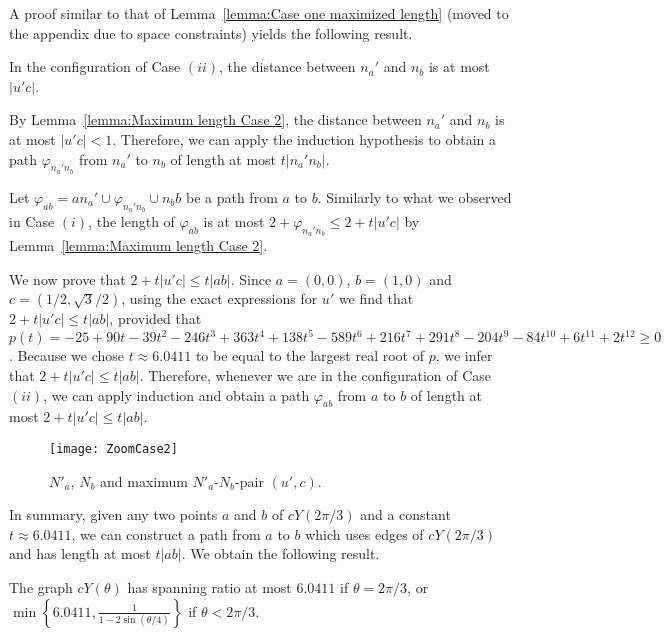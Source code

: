 \documentclass{cccg14}
\newcommand{\cyao}{\ensuremath{cY(\theta)}\xspace}
\newcommand{\cyaoOneTwenty}{\ensuremath{cY(2\pi/3)}\xspace}
\newcommand{\spanningRationCyao}{\ensuremath{6.0411}\xspace}
\begin{document}
A proof similar to that of Lemma~\ref{lemma:Case one maximized length} (moved to the appendix due to space constraints) yields the following result. \begin{lemma}\label{lemma:Maximum length Case 2}
In the configuration of Case $(ii)$, the distance between $n_a'$ and $n_b$ is at most $|u'c|$.
\end{lemma}

By Lemma~\ref{lemma:Maximum length Case 2}, the distance between $n_a'$ and $n_b$ is at most $|u'c|< 1$. Therefore, we can apply the induction hypothesis to obtain a path $\varphi_{n_a'n_b}$ from $n_a'$ to $n_b$ of length at most $t|n_a'n_b|$.


Let $\varphi_{ab} = a n_a' \cup \varphi_{n_a'n_b} \cup n_b b$ be a path from $a$ to $b$. 
Similarly to what we observed in Case $(i)$,
the length of $\varphi_{ab}$ is at most $2 + \varphi_{n_a'n_b} \leq 2 + t|u'c|$ by Lemma~\ref{lemma:Maximum length Case 2}.

We now prove that $2 + t|u'c| \leq t|ab|$.
Since $a=(0,0)$, $b=(1,0)$ and $c=(1/2,\sqrt{3}/2)$, using the exact expressions for $u'$
we find that $2 + t|u'c| \leq t|ab|$,
provided that $p(t)  = -25 + 90 t - 39 t^2 - 246 t^3 + 363 t^4 + 138 t^5 - 589 t^6 + 216 t^7 + 291 t^8 - 204 t^9 - 84 t^{10} + 6 t^{11} + 2 t^{12} \geq 0$.
Because we chose  $t\approx \spanningRationCyao$ to be equal to the largest real root of $p$, we infer that $2 + t|u'c| \leq t|ab|$.
Therefore,
whenever we are in the configuration of Case $(ii)$,
we can apply induction and obtain a path $\varphi_{ab}$ from $a$ to $b$ of length at most $2 + t|u'c| \leq t|ab|$.

\begin{figure}[b]\centering
\texttt{[image: ZoomCase2]}
\caption{\small $N'_a$, $N_b$ and maximum $N'_a$-$N_b$-pair $(u', c)$.}
\label{fig:Zoom Case 2}
\end{figure}


In summary,
given any two points $a$ and $b$ of \cyaoOneTwenty and a constant $t\approx \spanningRationCyao$,
we can construct a path from $a$ to $b$ which uses edges of \cyaoOneTwenty and has length at most $t|ab|$. We obtain the following result.

\vspace{-0.3em}
\begin{theorem}
 \label{thm:contyao}
 The graph  \cyao has spanning ratio at most $\spanningRationCyao$ if $\theta = 2\pi/3$, or $\min\left\{\spanningRationCyao, \frac{1}{1 - 2 \sin (\theta/4)}\right\}$ if $\theta < 2\pi/3$.
\end{theorem}
\end{document}
